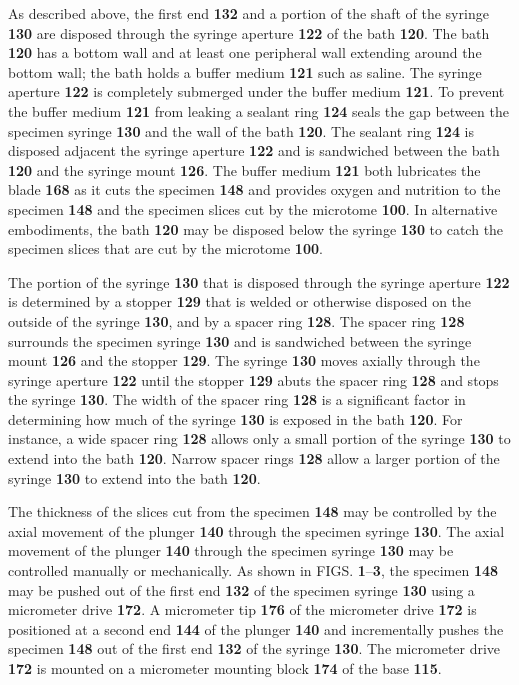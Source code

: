 \documentclass{article}
\begin{document}
As described above, the first end \textbf{132} and a portion of the shaft of the syringe \textbf{130} are disposed through the syringe aperture \textbf{122} of the bath \textbf{120}. The bath \textbf{120} has a bottom wall and at least one peripheral wall extending around the bottom wall; the bath holds a buffer medium \textbf{121} such as saline. The syringe aperture \textbf{122} is completely submerged under the buffer medium \textbf{121}. To prevent the buffer medium \textbf{121} from leaking a sealant ring \textbf{124} seals the gap between the specimen syringe \textbf{130} and the wall of the bath \textbf{120}. The sealant ring \textbf{124} is disposed adjacent the syringe aperture \textbf{122} and is sandwiched between the bath \textbf{120} and the syringe mount \textbf{126}. The buffer medium \textbf{121} both lubricates the blade \textbf{168} as it cuts the specimen \textbf{148} and provides oxygen and nutrition to the specimen \textbf{148} and the specimen slices cut by the microtome \textbf{100}. In alternative embodiments, the bath \textbf{120} may be disposed below the syringe \textbf{130} to catch the specimen slices that are cut by the microtome \textbf{100}.

The portion of the syringe \textbf{130} that is disposed through the syringe aperture \textbf{122} is determined by a stopper \textbf{129} that is welded or otherwise disposed on the outside of the syringe \textbf{130}, and by a spacer ring \textbf{128}. The spacer ring \textbf{128} surrounds the specimen syringe \textbf{130} and is sandwiched between the syringe mount \textbf{126} and the stopper \textbf{129}. The syringe \textbf{130} moves axially through the syringe aperture \textbf{122} until the stopper \textbf{129} abuts the spacer ring \textbf{128} and stops the syringe \textbf{130}. The width of the spacer ring \textbf{128} is a significant factor in determining how much of the syringe \textbf{130} is exposed in the bath \textbf{120}. For instance, a wide spacer ring \textbf{128} allows only a small portion of the syringe \textbf{130} to extend into the bath \textbf{120}. Narrow spacer rings \textbf{128} allow a larger portion of the syringe \textbf{130} to extend into the bath \textbf{120}.

The thickness of the slices cut from the specimen \textbf{148} may be controlled by the axial movement of the plunger \textbf{140} through the specimen syringe \textbf{130}. The axial movement of the plunger \textbf{140} through the specimen syringe \textbf{130} may be controlled manually or mechanically. As shown in FIGS. \textbf{1}–\textbf{3}, the specimen \textbf{148} may be pushed out of the first end \textbf{132} of the specimen syringe \textbf{130} using a micrometer drive \textbf{172}. A micrometer tip \textbf{176} of the micrometer drive \textbf{172} is positioned at a second end \textbf{144} of the plunger \textbf{140} and incrementally pushes the specimen \textbf{148} out of the first end \textbf{132} of the syringe \textbf{130}. The micrometer drive \textbf{172} is mounted on a micrometer mounting block \textbf{174} of the base \textbf{115}.
\end{document}
